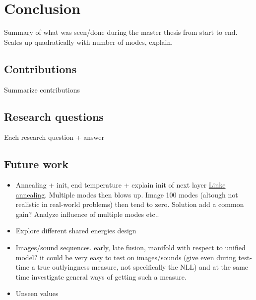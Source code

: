 \chapter{Conclusion} 
\label{chapter-conclusion} 

Summary of what was seen/done during the master thesis from start to end. Scales up quadratically with number of modes, explain.


\section{Contributions}
Summarize contributions



\section{Research questions}
Each research question + answer



\section{Future work}
\begin{itemize}
\item Annealing + init, end temperature + explain init of next layer \href{http://what-when-how.com/artificial-intelligence/a-comparison-of-cooling-schedules-for-simulated-annealing-artificial-intelligence/}{Linke annealing}. Multiple modes then blows up. Image 100 modes (altough not realistic in real-world problems) then tend to zero. Solution add a common gain? Analyze influence of multiple modes etc..

\item Explore different shared energies design

\item Images/sound sequences. early, late fusion, manifold with respect to unified model? it could be very easy to test on images/sounds (give even during test-time a true outlyingness measure, not specifically the NLL) and at the same time investigate general ways of getting such a measure.

\item Unseen values
\end{itemize}


